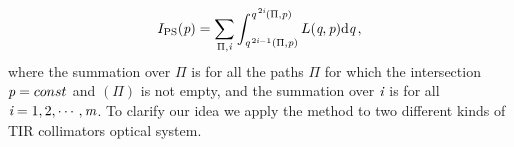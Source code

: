 \begin{equation}
I_{\textrm{PS}}(\textit{p}) = \sum_{\Pi, \textit{i} }\int_{\textit{q}^{\,2\textit{i}-1}(\Pi, \textit{p})}^{\textit{q}^{\,2\textit{i}}( \Pi, \textit{p})}L(\textit{q}, \textit{p})\textrm{d}\textit{q}\,,
\label{eq:Ips}
\end{equation}
where the summation over $\Pi$ is for all the paths $\Pi$ for which the intersection $\textit{p} = const$ and $(\Pi)$ is not empty, and the summation over $\textit{i}$ is for all $\textit{i} = 1,2, \cdots, \textit{m}$.
To clarify our idea we apply the method to two different kinds of TIR collimators optical system.
